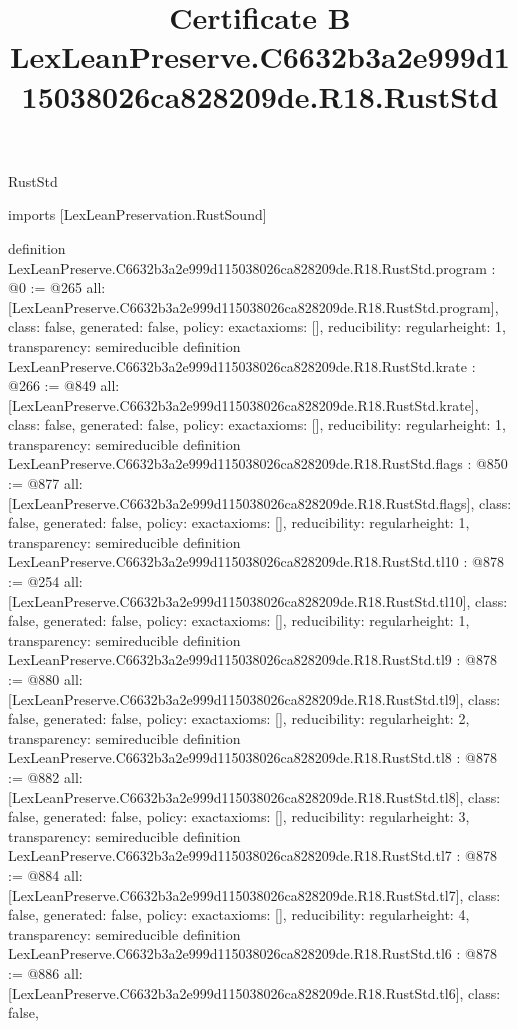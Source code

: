 \begin{lexlean}{RustStd}
\title{Certificate B LexLeanPreserve.C6632b3a2e999d115038026ca828209de.R18.RustStd}
\begin{coremodule}
imports [LexLeanPreservation.RustSound]

definition LexLeanPreserve.C6632b3a2e999d115038026ca828209de.R18.RustStd.program : @0 := @265 {
  all: [LexLeanPreserve.C6632b3a2e999d115038026ca828209de.R18.RustStd.program],
  class: false,
  generated: false,
  policy: exact{axioms: []},
  reducibility: regular{height: 1},
  transparency: semireducible
}
definition LexLeanPreserve.C6632b3a2e999d115038026ca828209de.R18.RustStd.krate : @266 := @849 {
  all: [LexLeanPreserve.C6632b3a2e999d115038026ca828209de.R18.RustStd.krate],
  class: false,
  generated: false,
  policy: exact{axioms: []},
  reducibility: regular{height: 1},
  transparency: semireducible
}
definition LexLeanPreserve.C6632b3a2e999d115038026ca828209de.R18.RustStd.flags : @850 := @877 {
  all: [LexLeanPreserve.C6632b3a2e999d115038026ca828209de.R18.RustStd.flags],
  class: false,
  generated: false,
  policy: exact{axioms: []},
  reducibility: regular{height: 1},
  transparency: semireducible
}
definition LexLeanPreserve.C6632b3a2e999d115038026ca828209de.R18.RustStd.tl10 : @878 := @254 {
  all: [LexLeanPreserve.C6632b3a2e999d115038026ca828209de.R18.RustStd.tl10],
  class: false,
  generated: false,
  policy: exact{axioms: []},
  reducibility: regular{height: 1},
  transparency: semireducible
}
definition LexLeanPreserve.C6632b3a2e999d115038026ca828209de.R18.RustStd.tl9 : @878 := @880 {
  all: [LexLeanPreserve.C6632b3a2e999d115038026ca828209de.R18.RustStd.tl9],
  class: false,
  generated: false,
  policy: exact{axioms: []},
  reducibility: regular{height: 2},
  transparency: semireducible
}
definition LexLeanPreserve.C6632b3a2e999d115038026ca828209de.R18.RustStd.tl8 : @878 := @882 {
  all: [LexLeanPreserve.C6632b3a2e999d115038026ca828209de.R18.RustStd.tl8],
  class: false,
  generated: false,
  policy: exact{axioms: []},
  reducibility: regular{height: 3},
  transparency: semireducible
}
definition LexLeanPreserve.C6632b3a2e999d115038026ca828209de.R18.RustStd.tl7 : @878 := @884 {
  all: [LexLeanPreserve.C6632b3a2e999d115038026ca828209de.R18.RustStd.tl7],
  class: false,
  generated: false,
  policy: exact{axioms: []},
  reducibility: regular{height: 4},
  transparency: semireducible
}
definition LexLeanPreserve.C6632b3a2e999d115038026ca828209de.R18.RustStd.tl6 : @878 := @886 {
  all: [LexLeanPreserve.C6632b3a2e999d115038026ca828209de.R18.RustStd.tl6],
  class: false,
}
\end{coremodule}
\end{lexlean}
